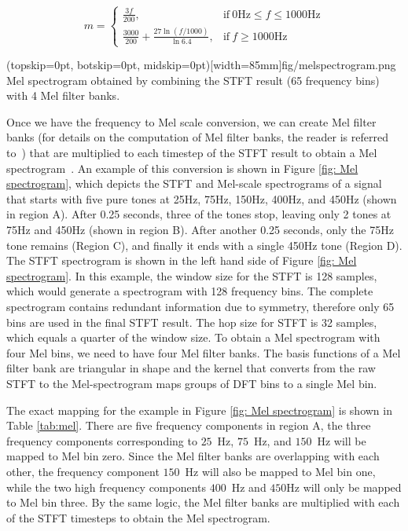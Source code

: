 \documentclass{ieeeaccess}
\begin{document}
\begin{equation}
    m=
    \begin{cases}
      \frac{3f}{200}, & \text{if}\ 0 \text{Hz} \leq f\leq1000 \text{Hz} \\
      \frac{3000}{200} + \frac{27\ln{(f/1000)}}{\ln{6.4}}, & \text{if}\ f \ge 1000\text{Hz}
    \end{cases}
    \label{mel-stanley}
\end{equation}

\Figure[t](topskip=0pt, botskip=0pt, midskip=0pt)[width=85mm]{fig/melspectrogram.png}
{Mel spectrogram obtained by combining the STFT result (65 frequency bins) with 4 Mel filter banks. \label{fig: Mel spectrogram}}


Once we have the frequency to Mel scale conversion, we can create Mel filter banks (for details on the computation of Mel filter banks, the reader is referred to~\cite{Davis1980ComparisonOP}) that are multiplied to each timestep of the STFT result to obtain a Mel spectrogram~\cite{rabiner2011theory}. An example of this conversion is shown in  Figure \ref{fig: Mel spectrogram}, which depicts the STFT and Mel-scale spectrograms of a signal that starts with five pure tones at 25Hz, 75Hz, 150Hz, 400Hz, and 450Hz (shown in region A). After 0.25 seconds, three of the tones stop, leaving only 2 tones at 75Hz and 450Hz (shown in region B). After another 0.25 seconds, only the 75Hz tone remains (Region C), and finally it ends with a single 450Hz tone (Region D). The STFT spectrogram is shown in the left hand side of Figure \ref{fig: Mel spectrogram}. In this example, the window size for the STFT is 128 samples, which would generate a spectrogram with 128 frequency bins. The complete spectrogram contains redundant information due to symmetry, therefore only 65 bins are used in the final STFT result. The hop size for STFT is 32 samples, which equals a quarter of the window size. To obtain a Mel spectrogram with four Mel bins, we need to have four Mel filter banks. The basis functions of a Mel filter bank are triangular in shape and the kernel that converts from the raw STFT to the Mel-spectrogram maps groups of DFT bins to a single Mel bin. %

The exact mapping for the example in Figure \ref{fig: Mel spectrogram} is shown in Table \ref{tab:mel}. There are five frequency components in region A, the three frequency components corresponding to $25$~Hz, $75$~Hz, and $150$~Hz will be mapped to Mel bin zero. Since the Mel filter banks are overlapping with each other, the frequency component $150$~Hz will also be mapped to Mel bin one, while the two high frequency components $400$~Hz and $450$Hz will only be mapped to Mel bin three. By the same logic, the Mel filter banks are multiplied with each of the STFT timesteps to obtain the Mel spectrogram.
\end{document}
